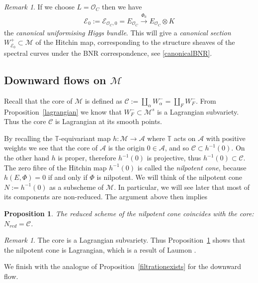 \documentclass[12pt]{article}
\numberwithin{equation}{section}
\newtheorem{proposition}[theorem]{Proposition}
\theoremstyle{remark}
\newtheorem{remark}[theorem]{Remark}
\theoremstyle{definition}
\numberwithin{theorem}{section}
\def\beq{\begin{eqnarray}}
\def\eeq{\end{eqnarray}}
\def\calE{{\mathcal E}}
\def\M{{\mathcal{M}}}
\def\calA{{\mathcal{A}}}
\newcommand{\T}{{\mathbb{T}}}
\def\calC{{\mathcal C}}
\def\calO{{\mathcal O}}
\renewcommand{\1}{\mathbbm{1}}
\begin{document}
\begin{remark}
	If we choose  $L=\calO_C$ then we have \beq\label{uniform}\calE_0:=\calE_{{\calO_C},0}=E_{\calO_C}\stackrel{\Phi_0}{\to}E_{\calO_C}\otimes K \eeq  the {\em canonical uniformising Higgs bundle}. This will give a {\em canonical section} $W^+_{\calE_0}\subset \M$ of the Hitchin map, corresponding to the structure sheaves of the spectral curves under  the BNR correspondence, see \eqref{canonicalBNR}. 
	
	
	
\end{remark}

\subsection{Downward flows on $\M$}

Recall that the core of $\M$ is defined as $\calC:=\coprod_\alpha W^-_\alpha = \coprod_F W^-_F$. From Proposition~\ref{lagrangian} we know that $W^-_F\subset \M^s$ is a Lagrangian subvariety. Thus the core $\calC$ is Lagrangian at its smooth points. 

By recalling the $\T$-equivariant map $h:\M\to\calA$ where $\T$ acts on $\calA$ with positive weights we see that the core of $\calA$ is the origin $0\in \calA$, and so $\calC\subset h^{-1}(0)$. On the other hand $h$ is proper, therefore $h^{-1}(0)$ is projective, thus $h^{-1}(0)\subset \calC$. The zero fibre of the Hitchin map $h^{-1}(0)$ is called the {\em nilpotent cone}, because $h(E,\Phi)=0$ if and only if $\Phi$ is nilpotent. We will think of the nilpotent cone $N:=h^{-1}(0)$ as a subscheme  of $\M$. In particular, we will see later that most of its components are non-reduced. The argument above then implies 

\begin{proposition}\label{nilpcore} The reduced scheme of the nilpotent cone coincides with the core: $N_{red}=\calC$. 
\end{proposition}
\begin{remark}
	The core is a Lagrangian subvariety. Thus Proposition~\ref{nilpcore} shows that the nilpotent cone is Lagrangian, which is a result of Laumon \cite[Theorem 3]{laumon}.
\end{remark}

We finish with the analogue of Proposition~\ref{filtrationexists} for the downward flow.
\end{document}

